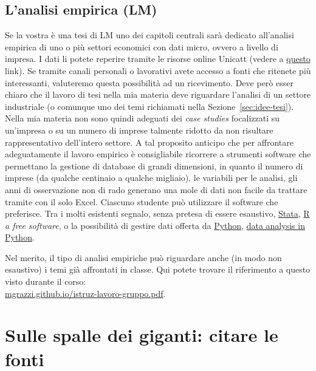 \documentclass[12pt]{article}
\begin{document}
\subsection*{L'analisi empirica (LM)}
Se la vostra \`e una tesi di LM uno dei capitoli centrali sar\`a
dedicato all'analisi empirica di uno o pi\`u settori economici con
dati micro, ovvero a livello di impresa. I dati li potete reperire
tramite le risorse online Unicatt (vedere a
\href{https://biblioteche.unicatt.it/brescia-servizi-per-utenti-interni-ricerche-bibliografiche-e-banche-dati}{questo}
link). Se tramite canali personali o lavorativi avete accesso a fonti
che ritenete pi\`u interessanti, valuteremo questa possibilit\`a ad un
ricevimento. Deve per\`o esser chiaro che il lavoro di tesi nella mia
materia deve riguardare l'analisi di un settore industriale (o
comunque uno dei temi richiamati nella
Sezione~\ref{sec:idee-tesi}). Nella mia materia non sono quindi
adeguati dei \textit{case studies} focalizzati su un'impresa o su un
numero di imprese talmente ridotto da non risultare rappresentativo
dell'intero settore. A tal proposito anticipo che per affrontare
adeguatamente il lavoro empirico \`e consigliabile ricorrere a
strumenti software che permettano la gestione di database di grandi
dimensioni, in quanto il numero di imprese (da qualche centinaio a
qualche migliaio), le variabili per le analisi, gli anni di
osservazione non di rado generano una mole di dati non facile da
trattare tramite con il solo Excel. Ciascuno studente pu\`o utilizzare
il software che preferisce. Tra i molti esistenti segnalo, senza
pretesa di essere esaustivo, \href{https://www.stata.com/}{Stata},
\href{https://www.r-project.org/}{R} \textit{a free software}, o la
possibilit\`a di gestire dati offerta da
\href{https://www.python.org/}{Python},
\href{http://www.data-analysis-in-python.org/}{data analysis in
  Python}.

Nel merito, il tipo di analisi empiriche pu\`o riguardare anche (in modo non
esaustivo) i temi gi\`a affrontati in classe. Qui potete trovare il
riferimento a questo
visto durante il corso:\\
\href{http://mgrazzi.github.io/istruz-lavoro-gruppo.pdf}{mgrazzi.github.io/istruz-lavoro-gruppo.pdf}.




\section{Sulle spalle dei giganti: citare le fonti}%
\end{document}

